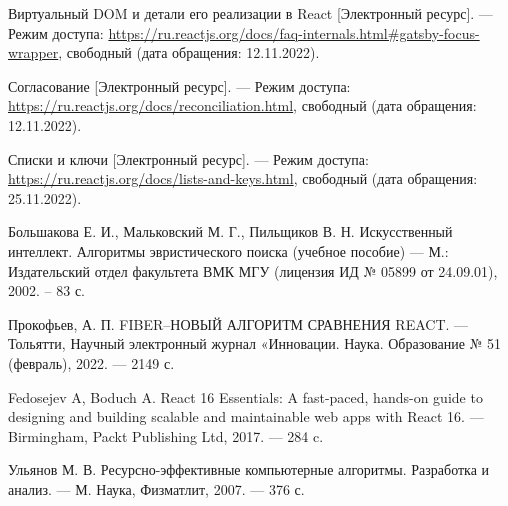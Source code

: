 \begin{thebibliography}{}
	Виртуальный DOM и детали его реализации в React [Электронный ресурс]. --- Режим доступа: \url{https://ru.reactjs.org/docs/faq-internals.html#gatsby-focus-wrapper}, свободный (дата обращения: 12.11.2022).
	
	Согласование [Электронный ресурс]. --- Режим доступа: \url{https://ru.reactjs.org/docs/reconciliation.html}, свободный (дата обращения: 12.11.2022).
	
	Списки и ключи [Электронный ресурс]. --- Режим доступа: \url{https://ru.reactjs.org/docs/lists-and-keys.html}, свободный (дата обращения: 25.11.2022).
	
	Большакова Е. И., Мальковский М. Г., Пильщиков В. Н. Искусственный интеллект. Алгоритмы эвристического поиска (учебное пособие) --- М.: Издательский отдел факультета ВМК МГУ (лицензия ИД № 05899 от 24.09.01),
	2002. -- 83 с.

	Прокофьев, А. П. FIBER–НОВЫЙ АЛГОРИТМ СРАВНЕНИЯ REACT. --- Тольятти, Научный электронный журнал «Инновации. Наука. Образование № 51 (февраль), 2022. --- 2149 с.

	Fedosejev A, Boduch A. React 16 Essentials: A fast-paced, hands-on guide to designing and building scalable and maintainable web apps with React 16. --- Birmingham, Packt Publishing Ltd, 2017. --- 284 c.

	Ульянов М. В. Ресурсно-эффективные компьютерные алгоритмы. Разработка и анализ. --- М. Наука, Физматлит, 2007. --- 376 с.
\end{thebibliography}
\endgroup

\pagebreak